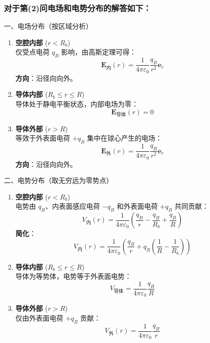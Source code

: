 \documentclass{article}
\begin{document}
{\subsubsection*{对于第(2)问电场和电势分布的解答如下：}




一、电场分布（按区域分析）

\begin{enumerate}
    \item \textbf{空腔内部} (\(r < R_b\))  \\
    仅受点电荷 \(q_B\) 影响，由高斯定理可得：
    \[
    \mathbf{E}_\text{内}(r) = \frac{1}{4\pi\varepsilon_0} \frac{q_B}{r^2} \mathbf{e}_r
    \]
    \textbf{方向}：沿径向向外。

    \item \textbf{导体内部} (\(R_b \leq r \leq R\))  \\
    导体处于静电平衡状态，内部电场为零：
    \[
    \mathbf{E}_\text{导体}(r) = 0
    \]

    \item \textbf{导体外部} (\(r > R\))  \\
    等效于外表面电荷 \(+q_B\) 集中在球心产生的电场：
    \[
    \mathbf{E}_\text{外}(r) = \frac{1}{4\pi\varepsilon_0} \frac{q_B}{r^2} \mathbf{e}_r
    \]
    \textbf{方向}：沿径向向外。
\end{enumerate}



二、电势分布（取无穷远为零势点）

\begin{enumerate}
    \item \textbf{空腔内部} (\(r < R_b\))  \\
    电势由 \(q_B\)、内表面感应电荷 \(-q_B\) 和外表面电荷 \(+q_B\) 共同贡献：
    \[
    V_\text{内}(r) = \frac{1}{4\pi\varepsilon_0} \left( \frac{q_B}{r} - \frac{q_B}{R_b} + \frac{q_B}{R} \right)
    \]
    \textbf{简化}：
    \[
    V_\text{内}(r) = \frac{1}{4\pi\varepsilon_0} \left( \frac{q_B}{r} + q_B \left( \frac{1}{R} - \frac{1}{R_b} \right) \right)
    \]

    \item \textbf{导体内部} (\(R_b \leq r \leq R\))  \\
    导体为等势体，电势等于外表面电势：
    \[
    V_\text{导体} = \frac{1}{4\pi\varepsilon_0} \frac{q_B}{R}
    \]

    \item \textbf{导体外部} (\(r > R\))  \\
    仅由外表面电荷 \(+q_B\) 贡献：
    \[
    V_\text{外}(r) = \frac{1}{4\pi\varepsilon_0} \frac{q_B}{r}
    \]
\end{enumerate}



}
\end{document}
